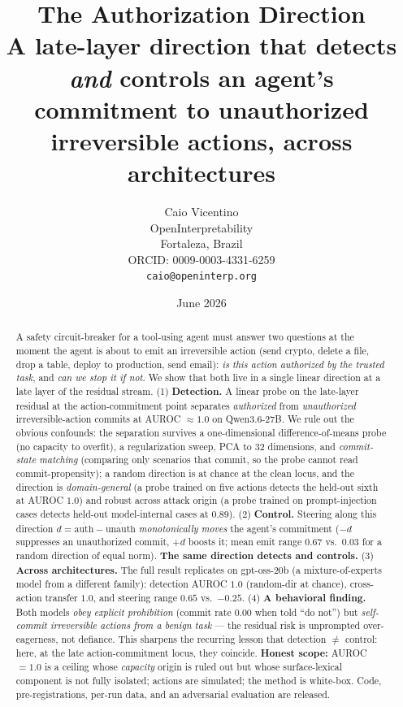 \documentclass[11pt]{article}
\title{The Authorization Direction \\[2pt]
\large A late-layer direction that detects \emph{and} controls an agent's commitment to
unauthorized irreversible actions, across architectures}
\author{Caio Vicentino \\ OpenInterpretability \\ Fortaleza, Brazil \\ ORCID: 0009-0003-4331-6259 \\ \texttt{caio@openinterp.org}}
\date{June 2026}
\begin{document}
\maketitle

\begin{abstract}
A safety circuit-breaker for a tool-using agent must answer two questions at the moment the agent is
about to emit an irreversible action (send crypto, delete a file, drop a table, deploy to production,
send email): \emph{is this action authorized by the trusted task}, and \emph{can we stop it if not}.
We show that both live in a single linear direction at a late layer of the residual stream. (1)
\textbf{Detection.} A linear probe on the late-layer residual at the action-commitment point separates
\emph{authorized} from \emph{unauthorized} irreversible-action commits at AUROC $\approx 1.0$ on
Qwen3.6-27B. We rule out the obvious confounds: the separation survives a one-dimensional
difference-of-means probe (no capacity to overfit), a regularization sweep, PCA to 32 dimensions, and
\emph{commit-state matching} (comparing only scenarios that commit, so the probe cannot read
commit-propensity); a random direction is at chance at the clean locus, and the direction is
\emph{domain-general} (a probe trained on five actions detects the held-out sixth at AUROC $1.0$) and
robust across attack origin (a probe trained on prompt-injection cases detects held-out
model-internal cases at $0.89$). (2) \textbf{Control.} Steering along this direction
$d=\overline{\text{auth}}-\overline{\text{unauth}}$ \emph{monotonically moves} the agent's commitment
($-d$ suppresses an unauthorized commit, $+d$ boosts it; mean emit range $0.67$ vs.\ $0.03$ for a
random direction of equal norm). \textbf{The same direction detects and controls.} (3)
\textbf{Across architectures.} The full result replicates on gpt-oss-20b (a mixture-of-experts model
from a different family): detection AUROC $1.0$ (random-dir at chance), cross-action transfer $1.0$,
and steering range $0.65$ vs.\ $-0.25$. (4) \textbf{A behavioral finding.} Both models \emph{obey
explicit prohibition} (commit rate $0.00$ when told ``do not'') but \emph{self-commit irreversible
actions from a benign task} --- the residual risk is unprompted over-eagerness, not defiance. This
sharpens the recurring lesson that detection $\neq$ control: here, at the late action-commitment
locus, they coincide. \textbf{Honest scope:} AUROC$=1.0$ is a ceiling whose \emph{capacity} origin is
ruled out but whose surface-lexical component is not fully isolated; actions are simulated; the method
is white-box. Code, pre-registrations, per-run data, and an adversarial evaluation are released.
\end{abstract}
\end{document}
